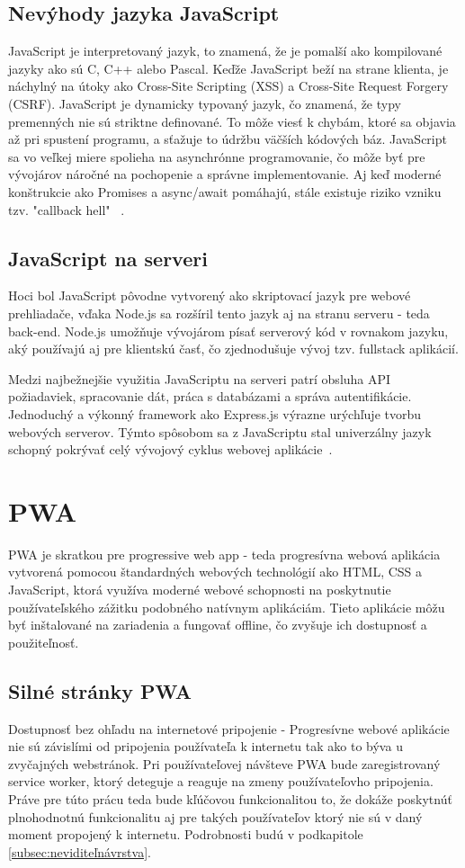 \subsection{Nevýhody jazyka JavaScript}
JavaScript je interpretovaný jazyk, to znamená, že je pomalší ako kompilované jazyky ako sú C, C++ alebo Pascal. 
Keďže JavaScript beží na strane klienta, je náchylný na útoky ako Cross-Site Scripting (XSS) a Cross-Site Request Forgery (CSRF).
JavaScript je dynamicky typovaný jazyk, čo znamená, že typy premenných nie sú striktne definované. To môže viesť k chybám, ktoré sa 
objavia až pri spustení programu, a sťažuje to údržbu väčších kódových báz. JavaScript sa vo veľkej miere spolieha na asynchrónne programovanie, 
čo môže byť pre vývojárov náročné na pochopenie a správne implementovanie. Aj keď moderné konštrukcie ako Promises a async/await pomáhajú, 
stále existuje riziko vzniku tzv. "callback hell" ~\cite{itpedia_js_downsides}.

\subsection{JavaScript na serveri}
Hoci bol JavaScript pôvodne vytvorený ako skriptovací jazyk pre webové prehliadače, vďaka Node.js sa rozšíril tento jazyk aj na stranu 
serveru - teda back-end. Node.js umožňuje vývojárom písať serverový kód v rovnakom jazyku, aký používajú aj pre klientskú časť, čo 
zjednodušuje vývoj tzv. fullstack aplikácií.

Medzi najbežnejšie využitia JavaScriptu na serveri patrí obsluha API požiadaviek, spracovanie dát, práca s databázami a správa autentifikácie. 
Jednoduchý a výkonný framework ako Express.js výrazne urýchľuje tvorbu webových serverov. Týmto spôsobom sa z JavaScriptu stal univerzálny 
jazyk schopný pokrývať celý vývojový cyklus webovej aplikácie~\cite{nodejs_gfg}.


\section{PWA}
PWA je skratkou pre progressive web app - teda progresívna webová aplikácia vytvorená pomocou štandardných webových technológií ako HTML, 
CSS a JavaScript, ktorá využíva moderné webové schopnosti na poskytnutie používateľského zážitku podobného natívnym aplikáciám. Tieto 
aplikácie môžu byť inštalované na zariadenia a fungovať offline, čo zvyšuje ich dostupnosť a použiteľnosť. 

\subsection{Silné stránky PWA}
Dostupnosť bez ohľadu na internetové pripojenie - Progresívne webové aplikácie nie sú závislími od pripojenia používateľa k internetu tak ako
to býva u zvyčajných webstránok. Pri používateľovej návšteve PWA bude zaregistrovaný service worker, ktorý deteguje a reaguje na
zmeny používateľovho pripojenia. Práve pre túto prácu teda bude kľúčovou funkcionalitou to, že dokáže poskytnúť plnohodnotnú funkcionalitu aj
pre takých používateľov ktorý nie sú v daný moment propojený k internetu. Podrobnosti budú v podkapitole \ref{subsec:neviditeľnávrstva}.

